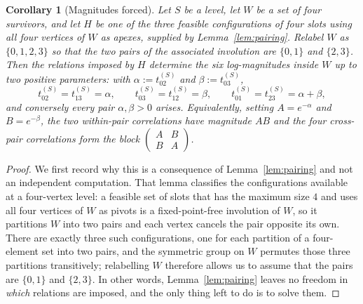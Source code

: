 \documentclass[11pt]{article}
\theoremstyle{plain}
\newtheorem{corollary}[theorem]{Corollary}
\theoremstyle{definition}
\theoremstyle{remark}
\begin{document}
\begin{aiblock}
\begin{corollary}[Magnitudes forced]\label{cor:magnitudes}
Let $S$ be a level, let $W$ be a set of four survivors, and let $H$ be one of the three feasible
configurations of four slots using all four vertices of $W$ as apexes, supplied by
Lemma~\ref{lem:pairing}. Relabel $W$ as $\{0,1,2,3\}$ so that the
two pairs of the associated involution are $\{0,1\}$ and $\{2,3\}$. Then the relations imposed by $H$
determine the six log-magnitudes inside $W$ up to two positive parameters: with
$\alpha:=t^{(S)}_{02}$ and $\beta:=t^{(S)}_{03}$,
\[
  t^{(S)}_{02}=t^{(S)}_{13}=\alpha,\qquad
  t^{(S)}_{03}=t^{(S)}_{12}=\beta,\qquad
  t^{(S)}_{01}=t^{(S)}_{23}=\alpha+\beta,
\]
and conversely every pair $\alpha,\beta>0$ arises. Equivalently, setting $A=e^{-\alpha}$ and
$B=e^{-\beta}$, the two within-pair correlations have magnitude $AB$ and the four cross-pair
correlations form the block $\begin{pmatrix}A&B\\B&A\end{pmatrix}$.
\end{corollary}

\begin{proof}
We first record why this is a consequence of Lemma~\ref{lem:pairing} and not an independent
computation. That lemma classifies the configurations available at a four-vertex level: a feasible set
of slots that has the maximum size $4$ and uses all four vertices of $W$ as pivots is a fixed-point-free
involution of $W$, so it partitions $W$ into two pairs and each vertex cancels the pair opposite its
own. There are exactly three such configurations, one for each partition of a four-element set into two
pairs, and the symmetric group on $W$ permutes those three partitions transitively; relabelling $W$
therefore allows us to assume that the pairs are $\{0,1\}$ and $\{2,3\}$. In other words, Lemma~\ref{lem:pairing}
leaves no freedom in \emph{which} relations are imposed, and the only thing left to do is to solve them.


\end{proof}
\end{aiblock}
\end{document}
